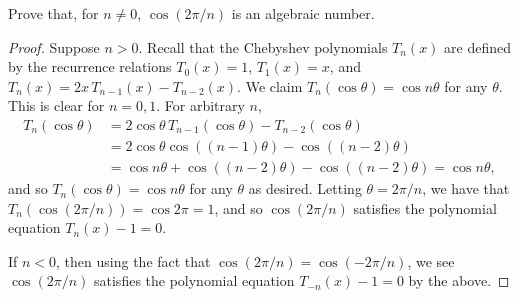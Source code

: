 \documentclass[12pt]{article}
\theoremstyle{remark}
\begin{document}
\begin{problem}
  Prove that, for $n\neq 0$, $\cos(2\pi/n)$ is an algebraic number.
\end{problem}
\begin{proof}
  Suppose $n > 0$. Recall that the Chebyshev polynomials $T_n(x)$ are defined by the recurrence relations $T_0(x) = 1$, $T_1(x) = x$, and $T_n(x) = 2x\,T_{n-1}(x) - T_{n-2}(x)$. We claim $T_n(\cos \theta) = \cos n\theta$ for any $\theta$. This is clear for $n=0,1$. For arbitrary $n$,
  \begin{align*}
    T_n(\cos \theta) &= 2\cos\theta\,T_{n-1}(\cos\theta) - T_{n-2}(\cos\theta)\\
    &= 2\cos\theta\cos\left( (n-1)\theta \right) - \cos\left( (n-2)\theta \right)\\
    &= \cos n\theta + \cos\left((n-2)\theta\right) - \cos\left( (n-2)\theta \right) = \cos n\theta,
  \end{align*}
  and so $T_n(\cos \theta) = \cos n\theta$ for any $\theta$ as desired. Letting $\theta = 2\pi/n$, we have that $T_n(\cos(2\pi/n)) = \cos 2\pi = 1$, and so $\cos(2\pi/n)$ satisfies the polynomial equation $T_n(x) - 1 = 0$.
  \par If $n < 0$, then using the fact that $\cos(2\pi/n) = \cos(-2\pi/n)$, we see $\cos(2\pi/n)$ satisfies the polynomial equation $T_{-n}(x)-1 = 0$ by the above.
\end{proof}
\end{document}
